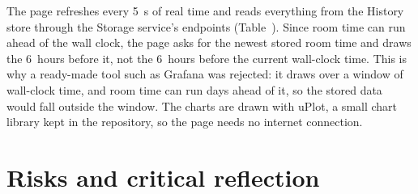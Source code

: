 \documentclass[11pt]{article}
\def\ref#1{\getrefnumber{#1}}%
\begin{document}
The page refreshes every 5~s of real time and reads everything from the
History store through the Storage service's endpoints
(Table~\ref{tab:endpoints}). Since room time can run ahead of the wall
clock, the page asks for the newest stored room time and draws the
6~hours before it, not the 6~hours before the current wall-clock time.
This is why a ready-made tool such as Grafana was rejected: it draws over
a window of wall-clock time, and room time can run days ahead of it, so
the stored data would fall outside the window. The charts are drawn with
uPlot, a small chart library kept in the repository, so the page needs no
internet connection.

\section{Risks and critical reflection}\label{sec:risks}

\end{document}

